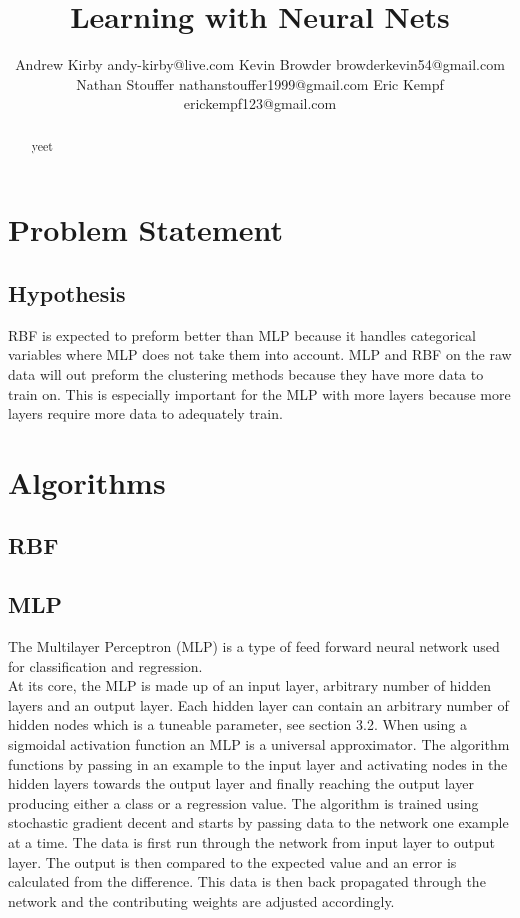 \documentclass[twoside,11pt]{article}
\begin{document}
\title{Learning with Neural Nets}

\author{\name Andrew Kirby \email andy-kirby@live.com \AND
		\name Kevin Browder \email browderkevin54@gmail.com \AND
		\name Nathan Stouffer \email nathanstouffer1999@gmail.com \AND
		\name Eric Kempf \email erickempf123@gmail.com }

\maketitle

\begin{abstract}
yeet
\end{abstract}

\section{Problem Statement}

\subsection*{Hypothesis}
RBF is expected to preform better than MLP because it handles categorical variables where MLP does not take them into account. MLP and RBF on the raw data will out preform the clustering methods because they have more data to train on. This is especially important for the MLP with more layers because more layers require more data to adequately train.
\section{Algorithms}
\subsection{RBF}

\subsection{MLP}
The Multilayer Perceptron (MLP) is a type of feed forward neural network used for classification and regression. \\
\indent At its core, the MLP is made up of an input layer, arbitrary number of hidden layers and an output layer. Each hidden layer can contain an arbitrary number of hidden nodes which is a tuneable parameter, see section 3.2.  When using a sigmoidal activation function an MLP is a universal approximator. The algorithm functions by passing in an example to the input layer and activating nodes in the hidden layers towards the output layer and finally reaching the output layer producing either a class or a regression value. The algorithm is trained using stochastic gradient decent and starts by passing data to the network one example at a time. The data is first run through the network from input layer to output layer. The output is then compared to the expected value and an error is calculated from the difference. This data is then back propagated through the network and the contributing weights are adjusted accordingly. 
\end{document}
